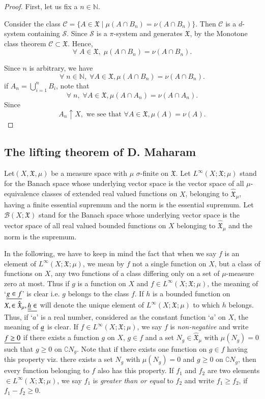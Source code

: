 \begin{proof}
First, let us fix a $n \in \mathbb{N}$. 

Consider the class $\mathscr{C} = \{A \in \mathfrak{X} \mid \mu (A
\cap B_n) = \nu (A \cap B_n)\}$. Then $\mathscr{C}$ is a $d$-system
containing $\mathscr{S}$. Since $\mathscr{S}$ is a $\pi$-system and
generates $\mathfrak{X}$, by the Monotone class theorem $\mathscr{C}
\subset \mathfrak{X}$. Hence, 
$$
\forall \; A \in \mathfrak{X}, \; \mu (A \cap B_n) = \nu (A \cap
B_n). 
$$

Since $n$ is arbitrary, we have 
$$
\forall \; n \in\mathbb{N}, \; \forall A \in \mathfrak{X}, \mu (A \cap
B_n) = \nu (A \cap B_n). 
$$
if $A_n = \bigcup\limits^n_{i=1}B_i $, note that
$$
\forall \; n,\; \forall A \in \mathfrak{X}, \mu (A \cap A_n) = \nu (A
\cap A_n). 
$$
Since
$$
A_n \uparrow X, \text{ we see that } \forall A \in \mathfrak{X}, \mu
(A) = \nu (A). 
$$
\end{proof}

\subsection{The lifting theorem of D. Maharam}\label{part1:chap3:sec2.2}

Let\pageoriginale $(X, \mathfrak{X}, \mu)$ be a measure space with
$\mu$ $\sigma$-finite on $\mathfrak{X}$. Let $L^\infty(X;
\mathfrak{X}; \mu)$ stand for the Banach space whose underlying vector
space is the vector space of all $\mu$-equivalence classes of extended
real valued functions on $X$, belonging to $\hat{\mathfrak{X}}_\mu$,
having a finite essential supremum and the norm is the essential
supremum. Let $\mathscr{B} (X; \mathfrak{X})$ stand for the Banach
space whose underlying vector space is the vector space of all real
valued bounded functions on $X$ belonging to $\hat{\mathfrak{X}}_\mu$
and the norm is the supremum.

In the following, we have to keep in mind the fact that when we say
$f$ is an element of $L^\infty(X; \mathfrak{X};\mu)$, we mean by $f$
not a single function on $X$, but a class of functions on $X$, any two
functions of a class differing only on a set of $\mu$-measure zero at
most. Thus if $g$ is a function on $X$ and $f \in L^\infty (X;
\mathfrak{X}; \mu)$, the meaning of `$\underline{g \in f}$' is clear i.e. $g$
belongs to the class $f$. If $h$ is a bounded function on $X,
\in\hat{\mathfrak{X}}_\mu , \underline{ \underline{h} \in }$ will denote the unique
element of $L^\infty (X; \mathfrak{X}; \mu)$ to which $h$
belongs. Thus, if `$a$' is a real number, considered as the constant
function `$a$' on $X$, the meaning of $\underline{a}$ is clear. If $f \in
L^\infty (X; \mathfrak{X}; \mu)$, we say $f$ is {\em non-negative }
and write $\underline{f \geq 0}$ if there exists a function $g$ on $X$, $g \in
f$ and a set $N_g \in \hat{\mathfrak{X}}_\mu$ with $\mu (N_g) = 0$
such that $g \geq 0$ on $\complement N_g$. Note that if there exists
one function on $g \in f$ having this property viz. there exists a set
$N_g$ with $\mu(N_g) = 0$ and $g \geq 0$ on $\complement N_g$, then
every function belonging to $f$ also has this property. If  $f_1$ and
$f_2$ are two elements $\in L^\infty (X; \mathfrak{X}; \mu) $, we
say $f_1$ is {\em greater than or equal} to $f_2$ and write $f_1 \geq
f_2$, if $f_1 - f_2 \geq 0$.

